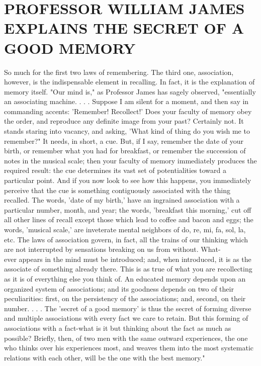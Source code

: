 \documentclass[10pt]{article}
\begin{document}
\section*{PROFESSOR WILLIAM JAMES EXPLAINS THE SECRET OF A GOOD MEMORY}
So much for the first two laws of remembering. The third one, association, however, is the indispensable element in recalling. In fact, it is the explanation of memory itself. "Our mind is," as Professor James has sagely observed, "essentially an associating machine. . . . Suppose I am silent for a moment, and then say in commanding accents: 'Remember! Recollect!' Does your faculty of memory obey the order, and reproduce any definite image from your past? Certainly not. It stands staring into vacancy, and asking, 'What kind of thing do you wish me to remember?" It needs, in short, a cue. But, if I say, remember the date of your birth, or remember what you had for breakfast, or remember the succession of notes in the musical scale; then your faculty of memory immediately produces the required result: the cue determines its vast set of potentialities toward a particular point. And if you now look to see how this happens, you immediately perceive that the cue is something contiguously associated with the thing recalled. The words, 'date of my birth,' have an ingrained association with a particular number, month, and year; the words, 'breakfast this morning,' cut off all other lines of recall except those which lead to coffee and bacon and eggs; the words, 'musical scale,' are inveterate mental neighbors of do, re, mi, fa, sol, la, etc. The laws of association govern, in fact, all the trains of our thinking which are not interrupted by sensations breaking on us from without. What-\\
ever appears in the mind must be introduced; and, when introduced, it is as the associate of something already there. This is as true of what you are recollecting as it is of everything else you think of. An educated memory depends upon an organized system of associations; and its goodness depends on two of their peculiarities: first, on the persistency of the associations; and, second, on their number. . . . The 'secret of a good memory' is thus the secret of forming diverse and multiple associations with every fact we care to retain. But this forming of associations with a fact-what is it but thinking about the fact as much as possible? Briefly, then, of two men with the same outward experiences, the one who thinks over his experiences most, and weaves them into the most systematic relations with each other, will be the one with the best memory."
\end{document}
